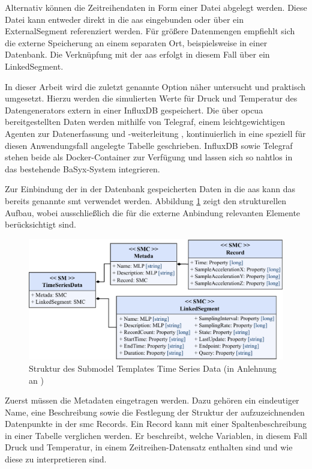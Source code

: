 Alternativ können die Zeitreihendaten in Form einer Datei abgelegt werden. 
Diese Datei kann entweder direkt in die \acs{aas} eingebunden oder über ein ExternalSegment referenziert werden.
Für größere Datenmengen empfiehlt sich die externe Speicherung an einem separaten Ort, beispielsweise in einer Datenbank.
Die Verknüpfung mit der \acs{aas} erfolgt in diesem Fall über ein LinkedSegment.

In dieser Arbeit wird die zuletzt genannte Option näher untersucht und praktisch umgesetzt.
Hierzu werden die simulierten Werte für Druck und Temperatur des Datengenerators extern in einer InfluxDB gespeichert.
Die über \acs{opcua} bereitgestellten Daten werden mithilfe von Telegraf, einem leichtgewichtigen Agenten zur Datenerfassung und -weiterleitung \cite{Influx}, kontinuierlich in eine speziell für diesen Anwendungsfall angelegte Tabelle geschrieben.
InfluxDB sowie Telegraf stehen beide als Docker-Container zur Verfügung und lassen sich so nahtlos in das bestehende BaSyx-System integrieren.

Zur Einbindung der in der Datenbank gespeicherten Daten in die \acs{aas} kann das bereits genannte \acs{smt} verwendet werden.
Abbildung \ref{fig:SMTTimeSeriesData} zeigt den strukturellen Aufbau, wobei ausschließlich die für die externe Anbindung relevanten Elemente berücksichtigt sind.

\begin{figure}[htbp]
    \centering
    \includegraphics[width=1\textwidth]{Bilder/TimeSeries/TimeSeriesData.pdf}
    \caption[Struktur des Submodel Templates Time Series Data]{Struktur des Submodel Templates Time Series Data (in Anlehnung an \cite{SpezifikationTimeSeriesData})}
    \label{fig:SMTTimeSeriesData}
\end{figure}

Zuerst müssen die Metadaten eingetragen werden. 
Dazu gehören ein eindeutiger Name, eine Beschreibung sowie die Festlegung der Struktur der aufzuzeichnenden Datenpunkte in der \acs{smc} Records.
Ein Record kann mit einer Spaltenbeschreibung in einer Tabelle verglichen werden.
Er beschreibt, welche Variablen, in diesem Fall Druck und Temperatur, in einem Zeitreihen-Datensatz enthalten sind und wie diese zu interpretieren sind.

